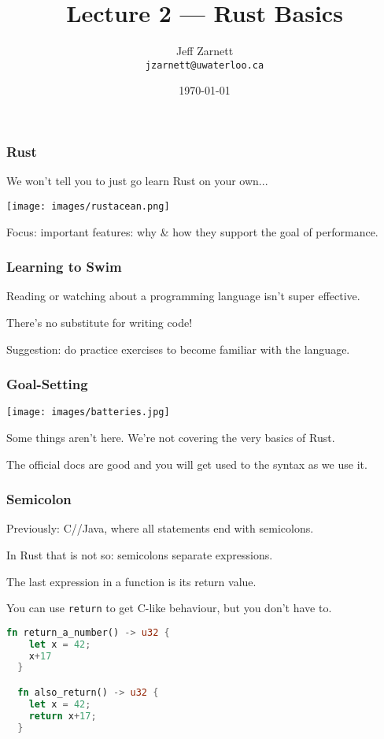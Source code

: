 


\title{Lecture 2 --- Rust Basics }

\author{Jeff Zarnett \\ \small \texttt{jzarnett@uwaterloo.ca}}
\date{\today}




\begin{frame}
  \titlepage

 \end{frame}
 
 
\begin{frame}
\frametitle{Rust}

We won't tell you to just go learn Rust on your own...

\begin{center}
	\texttt{[image: images/rustacean.png]}
\end{center}

Focus: important features: why \& how they support the goal of performance.

\end{frame}


\begin{frame}
\frametitle{Learning to Swim}

Reading or watching about a programming language isn't super effective.

There's no substitute for writing code! 

Suggestion: do practice exercises to become familiar with the language.

\end{frame}


\begin{frame}
\frametitle{Goal-Setting}

\begin{center}
	\texttt{[image: images/batteries.jpg]}
\end{center}

Some things aren't here. We're not covering the very basics of Rust.

The official docs are good and you will get used to the syntax as we use it.

\end{frame}


\begin{frame}[fragile]
\frametitle{Semicolon}

Previously: C/\CPP/Java, where all statements end with semicolons.

In Rust that is not so: semicolons separate expressions. 

The last expression in a function is its return value. 

You can use \texttt{return} to get C-like behaviour, but you don't have to.
\begin{lstlisting}[language=Rust]
  fn return_a_number() -> u32 {
    let x = 42;
    x+17
  }

  fn also_return() -> u32 {
    let x = 42;
    return x+17;
  }
\end{lstlisting}
\end{frame}


